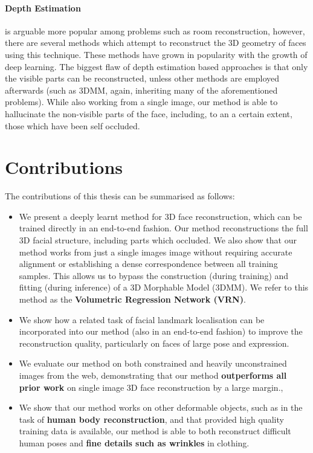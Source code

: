\paragraph{Depth Estimation} is arguable more popular among problems
such as room reconstruction, however, there are several methods which
attempt to reconstruct the 3D geometry of faces using this
technique. These methods have grown in popularity with the growth of
deep learning. The biggest flaw of depth estimation based approaches
is that only the visible parts can be reconstructed, unless other
methods are employed afterwards (such as 3DMM, again, inheriting many
of the aforementioned problems). While also working from a single
image, our method is able to hallucinate the non-visible parts of the
face, including, to an a certain extent, those which have been self
occluded.



\section{Contributions}

The contributions of this thesis can be summarised as follows:

\begin{itemize}
\item %
  We present a deeply learnt method for 3D face reconstruction, which
  can be trained directly in an end-to-end fashion. Our method
  reconstructions the full 3D facial structure, including parts which
  occluded. We also show that our method works from just a single
  images image without requiring accurate alignment or establishing a
  dense correspondence between all training samples.  This allows us
  to bypass the construction (during training) and fitting (during
  inference) of a 3D Morphable Model (3DMM).  We refer to this method
  as the \textbf{Volumetric Regression Network (VRN)}.

\item %
  We show how a related task of facial landmark localisation can be
  incorporated into our method (also in an end-to-end fashion) to
  improve the reconstruction quality, particularly on faces of large
  pose and expression.

\item We evaluate our method on both constrained and heavily
  unconstrained images from the web, demonstrating that our method
  \textbf{outperforms all prior work} on single image 3D face
  reconstruction by a large margin.,

\item We show that our method works on other deformable objects, such
  as in the task of \textbf{human body reconstruction}, and that
  provided high quality training data is available, our method is able
  to both reconstruct difficult human poses and \textbf{fine details
    such as wrinkles} in clothing.

\end{itemize}

